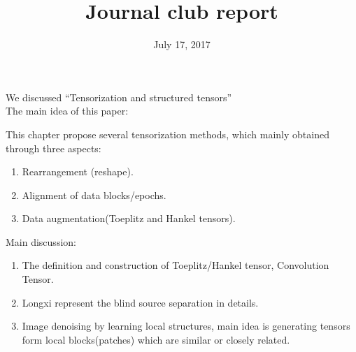 \documentclass[UTF8]{article}
\begin{document}
	\title{Journal club report}	
	\date{July 17, 2017} 
	\maketitle
    	We discussed “Tensorization and structured tensors”\\
    	The main idea of this paper:
    	
    	This chapter propose several tensorization methods, which mainly obtained through three aspects:
    		\begin{enumerate}[1)]
    		\item Rearrangement (reshape).
    		\item Alignment of data blocks/epochs.
    		\item Data augmentation(Toeplitz and Hankel tensors).
    	\end{enumerate}
  
    	Main discussion:
    	\begin{enumerate}[1)]
    		\item The definition and construction of Toeplitz/Hankel tensor, Convolution Tensor.
    		\item	Longxi represent the blind source separation in details.
    		\item	Image denoising by learning local structures, main idea is generating tensors form local blocks(patches) which are similar or closely related.
    	\end{enumerate}
    
   	
    		
\end{document}
